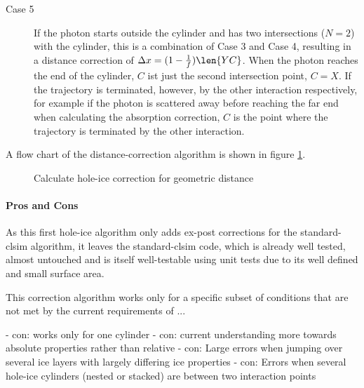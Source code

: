 \begin{description}
  \item[Case 5] If the photon starts outside the cylinder and has two intersections ($N = 2$) with the cylinder, this is a combination of Case 3 and Case 4, resulting in a distance correction of $\Delta x = (1 - \frac{1}{f})\len{YC}$. When the photon reaches the end of the cylinder, $C$ ist just the second intersection point, $C = X$. If the trajectory is terminated, however, by the other interaction respectively, for example if the photon is scattered away before reaching the far end when calculating the absorption correction, $C$ is the point where the trajectory is terminated by the other interaction.
\end{description}

A flow chart of the distance-correction algorithm is shown in figure \ref{fig:Eeshi4Oh}.

\begin{figure}[htbp]
  \caption{Calculate hole-ice correction for geometric distance}
  \label{fig:Eeshi4Oh}
\end{figure}

\paragraph{Pros and Cons}
As this first hole-ice algorithm only adds ex-post corrections for the standard-clsim algorithm, it leaves the standard-clsim code, which is already well tested, almost untouched and is itself well-testable using unit tests due to its well defined and small surface area.

This correction algorithm works only for a specific subset of conditions that are not met by the current requirements of ...

- con: works only for one cylinder
- con: current understanding more towards absolute properties rather than relative
- con: Large errors when jumping over several ice layers with largely differing ice properties
- con: Errors when several hole-ice cylinders (nested or stacked) are between two interaction points

